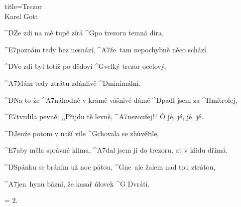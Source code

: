 \begin{song}{title=\predtitle\centering Trezor \\\large Karel Gott  \vspace*{-0.3cm}}  %
\begin{centerjustified}
\nejnejvetsi

\sloka
	^{D}Ze zdi na mě tupě zírá ^{G}po trezoru temná díra,

	^{E7\z}poznám tedy bez nesnází, ^{A7\z}že~tam nepochybně něco schází.

	^{D}Ve zdi byl totiž po dědovi ^{G\z}velký trezor ocelový.

	^{A7\z}Mám tedy ztrátu zdánlivě ^{\z D}minimální.

\sloka
	^{D}Na to že ^{A7\z}náhodně v krámě vášnivé dámě ^{D\z}padl jsem za ^{Hmi}trofej,

	^{E7\z}tvrdila pevně: ,,Přijdu tě levně, ^{A7\z}nezoufej!{}`` Ó jé, jé, jé, jé.

	^{D\z}Jenže potom v naší vile ^{G\z}chovala se zhůvěřile,

	^{E7}aby měla správné klima, ^{A7}dal jsem ji do trezoru, ať v klidu dřímá.

	^{D\z}Spánku se bráním už noc pátou, ^{G\z}ne~ale žalem nad tou ztrátou,

	^{A7\z}jen~hynu bázní, že kasař úlovek ^{G D}vrátí.

\sloka = 2.


\end{centerjustified}
\setcounter{Slokočet}{0}
\end{song}
